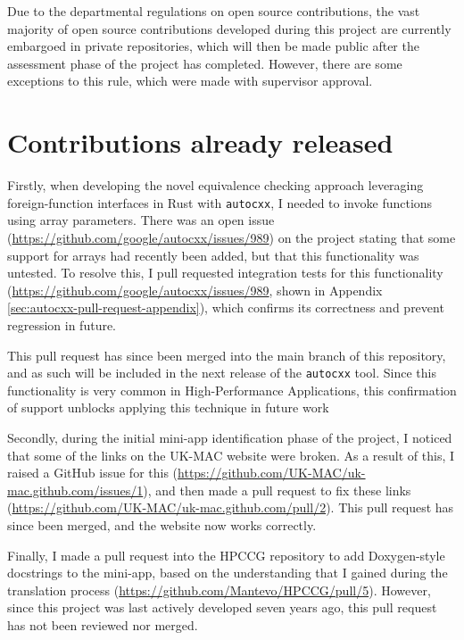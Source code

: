 Due to the departmental regulations on open source contributions, the vast majority of open source contributions developed during this project are currently embargoed in private repositories, which will then be made public after the assessment phase of the project has completed. However, there are some exceptions to this rule, which were made with supervisor approval.

\section{Contributions already released}
\label{ssec:open-source-already-released}

Firstly, when developing the novel equivalence checking approach leveraging foreign-function interfaces in Rust with \texttt{autocxx}, I needed to invoke functions using array parameters. There was an open issue (\url{https://github.com/google/autocxx/issues/989}) on the project stating that some support for arrays had recently been added, but that this functionality was untested. To resolve this, I pull requested integration tests for this functionality (\url{https://github.com/google/autocxx/issues/989}, shown in Appendix \ref{sec:autocxx-pull-request-appendix}), which confirms its correctness and prevent regression in future.

This pull request has since been merged into the main branch of this repository, and as such will be included in the next release of the \texttt{autocxx} tool. Since this functionality is very common in High-Performance Applications, this confirmation of support unblocks applying this technique in future work

Secondly, during the initial mini-app identification phase of the project, I noticed that some of the links on the UK-MAC website were broken. As a result of this, I raised a GitHub issue for this (\url{https://github.com/UK-MAC/uk-mac.github.com/issues/1}), and then made a pull request to fix these links (\url{https://github.com/UK-MAC/uk-mac.github.com/pull/2}). This pull request has since been merged, and the website now works correctly.

Finally, I made a pull request into the HPCCG repository to add Doxygen-style docstrings to the mini-app, based on the understanding that I gained during the translation process (\url{https://github.com/Mantevo/HPCCG/pull/5}). However, since this project was last actively developed seven years ago, this pull request has not been reviewed nor merged.

